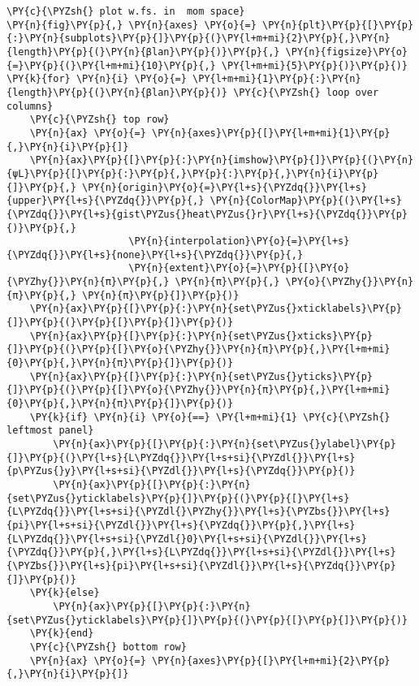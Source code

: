 \begin{Verbatim}[commandchars=\\\{\}]
\PY{c}{\PYZsh{} plot w.fs. in  mom space}
\PY{n}{fig}\PY{p}{,} \PY{n}{axes} \PY{o}{=} \PY{n}{plt}\PY{p}{[}\PY{p}{:}\PY{n}{subplots}\PY{p}{]}\PY{p}{(}\PY{l+m+mi}{2}\PY{p}{,}\PY{n}{length}\PY{p}{(}\PY{n}{βlan}\PY{p}{)}\PY{p}{,} \PY{n}{figsize}\PY{o}{=}\PY{p}{(}\PY{l+m+mi}{10}\PY{p}{,} \PY{l+m+mi}{5}\PY{p}{)}\PY{p}{)}
\PY{k}{for} \PY{n}{i} \PY{o}{=} \PY{l+m+mi}{1}\PY{p}{:}\PY{n}{length}\PY{p}{(}\PY{n}{βlan}\PY{p}{)} \PY{c}{\PYZsh{} loop over columns}
    \PY{c}{\PYZsh{} top row}
    \PY{n}{ax} \PY{o}{=} \PY{n}{axes}\PY{p}{[}\PY{l+m+mi}{1}\PY{p}{,}\PY{n}{i}\PY{p}{]}
    \PY{n}{ax}\PY{p}{[}\PY{p}{:}\PY{n}{imshow}\PY{p}{]}\PY{p}{(}\PY{n}{ψL}\PY{p}{[}\PY{p}{:}\PY{p}{,}\PY{p}{:}\PY{p}{,}\PY{n}{i}\PY{p}{]}\PY{p}{,} \PY{n}{origin}\PY{o}{=}\PY{l+s}{\PYZdq{}}\PY{l+s}{upper}\PY{l+s}{\PYZdq{}}\PY{p}{,} \PY{n}{ColorMap}\PY{p}{(}\PY{l+s}{\PYZdq{}}\PY{l+s}{gist\PYZus{}heat\PYZus{}r}\PY{l+s}{\PYZdq{}}\PY{p}{)}\PY{p}{,}
                     \PY{n}{interpolation}\PY{o}{=}\PY{l+s}{\PYZdq{}}\PY{l+s}{none}\PY{l+s}{\PYZdq{}}\PY{p}{,}
                     \PY{n}{extent}\PY{o}{=}\PY{p}{[}\PY{o}{\PYZhy{}}\PY{n}{π}\PY{p}{,} \PY{n}{π}\PY{p}{,} \PY{o}{\PYZhy{}}\PY{n}{π}\PY{p}{,} \PY{n}{π}\PY{p}{]}\PY{p}{)}
    \PY{n}{ax}\PY{p}{[}\PY{p}{:}\PY{n}{set\PYZus{}xticklabels}\PY{p}{]}\PY{p}{(}\PY{p}{[}\PY{p}{]}\PY{p}{)}
    \PY{n}{ax}\PY{p}{[}\PY{p}{:}\PY{n}{set\PYZus{}xticks}\PY{p}{]}\PY{p}{(}\PY{p}{[}\PY{o}{\PYZhy{}}\PY{n}{π}\PY{p}{,}\PY{l+m+mi}{0}\PY{p}{,}\PY{n}{π}\PY{p}{]}\PY{p}{)}
    \PY{n}{ax}\PY{p}{[}\PY{p}{:}\PY{n}{set\PYZus{}yticks}\PY{p}{]}\PY{p}{(}\PY{p}{[}\PY{o}{\PYZhy{}}\PY{n}{π}\PY{p}{,}\PY{l+m+mi}{0}\PY{p}{,}\PY{n}{π}\PY{p}{]}\PY{p}{)}
    \PY{k}{if} \PY{n}{i} \PY{o}{==} \PY{l+m+mi}{1} \PY{c}{\PYZsh{} leftmost panel}
        \PY{n}{ax}\PY{p}{[}\PY{p}{:}\PY{n}{set\PYZus{}ylabel}\PY{p}{]}\PY{p}{(}\PY{l+s}{L\PYZdq{}}\PY{l+s+si}{\PYZdl{}}\PY{l+s}{p\PYZus{}y}\PY{l+s+si}{\PYZdl{}}\PY{l+s}{\PYZdq{}}\PY{p}{)}
        \PY{n}{ax}\PY{p}{[}\PY{p}{:}\PY{n}{set\PYZus{}yticklabels}\PY{p}{]}\PY{p}{(}\PY{p}{[}\PY{l+s}{L\PYZdq{}}\PY{l+s+si}{\PYZdl{}\PYZhy{}}\PY{l+s}{\PYZbs{}}\PY{l+s}{pi}\PY{l+s+si}{\PYZdl{}}\PY{l+s}{\PYZdq{}}\PY{p}{,}\PY{l+s}{L\PYZdq{}}\PY{l+s+si}{\PYZdl{}0}\PY{l+s+si}{\PYZdl{}}\PY{l+s}{\PYZdq{}}\PY{p}{,}\PY{l+s}{L\PYZdq{}}\PY{l+s+si}{\PYZdl{}}\PY{l+s}{\PYZbs{}}\PY{l+s}{pi}\PY{l+s+si}{\PYZdl{}}\PY{l+s}{\PYZdq{}}\PY{p}{]}\PY{p}{)}
    \PY{k}{else}
        \PY{n}{ax}\PY{p}{[}\PY{p}{:}\PY{n}{set\PYZus{}yticklabels}\PY{p}{]}\PY{p}{(}\PY{p}{[}\PY{p}{]}\PY{p}{)}
    \PY{k}{end}
    \PY{c}{\PYZsh{} bottom row}
    \PY{n}{ax} \PY{o}{=} \PY{n}{axes}\PY{p}{[}\PY{l+m+mi}{2}\PY{p}{,}\PY{n}{i}\PY{p}{]}

\end{Verbatim}
